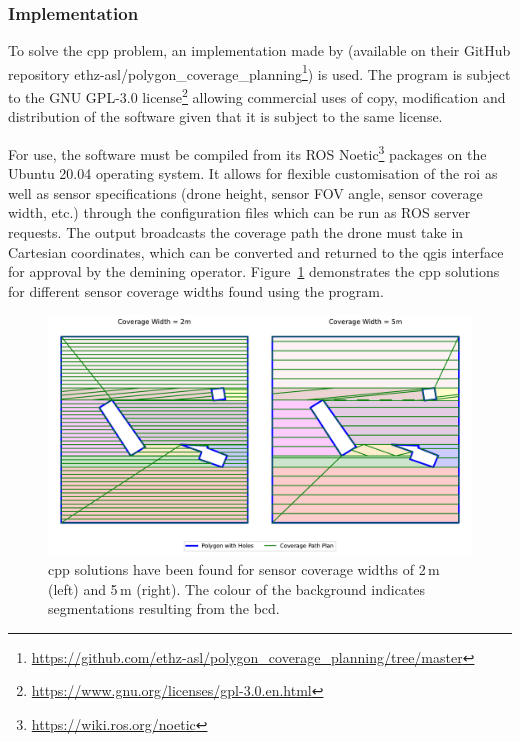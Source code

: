 \subsubsection{Implementation}

To solve the \gls{cpp} problem, an implementation made by \cite{bahnemann2021cpp} (available on their GitHub repository ethz-asl/polygon\_coverage\_planning\footnote{\url{https://github.com/ethz-asl/polygon_coverage_planning/tree/master}}) is used. The program is subject to the GNU GPL-3.0 license\footnote{\url{https://www.gnu.org/licenses/gpl-3.0.en.html}} allowing commercial uses of copy, modification and distribution of the software given that it is subject to the same license. 

For use, the software must be compiled from its ROS Noetic\footnote{\url{https://wiki.ros.org/noetic}} packages on the Ubuntu 20.04 operating system. It allows for flexible customisation of the \gls{roi} as well as sensor specifications (drone height, sensor FOV angle, sensor coverage width, etc.) through the configuration files which can be run as ROS server requests. The output broadcasts the coverage path the drone must take in Cartesian coordinates, which can be converted and returned to the \gls{qgis} interface for approval by the demining operator. Figure~\ref{fig:msp_bahnemann} demonstrates the \gls{cpp} solutions for different sensor coverage widths found using the program. 

\begin{figure}[h!]
    \centering
    \includegraphics[width=\linewidth]{figs/Jihwan/CPP_diff_widths.pdf}
    \caption[CPP Solution Examples]
    {\gls{cpp} solutions have been found for sensor coverage widths of 2\,m (left) and 5\,m (right). The colour of the background indicates segmentations resulting from the \gls{bcd}.}
    \label{fig:msp_bahnemann}
\end{figure}

